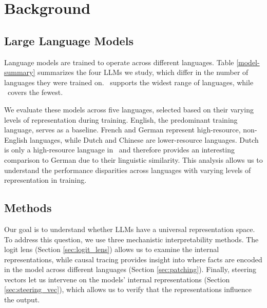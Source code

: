 \section{Background} \label{sec:background}

\subsection{Large Language Models}

Language models are trained to operate across different languages. 
Table \ref{model-summary} summarizes the four LLMs we study, which differ in the number of languages they were trained on. 
\aya \ supports the widest range of languages, while \gemma \ covers the fewest.

We evaluate these models across five languages, selected based on their varying levels of representation during training. English, the predominant training language, serves as a baseline. French and German represent high-resource, non-English languages, while Dutch and Chinese are lower-resource languages. Dutch is only a high-resource language in \aya \ and therefore provides an interesting comparison to German due to their linguistic similarity.
This analysis allows us to understand the performance disparities across languages with varying levels of representation in training.

\subsection{Methods}

Our goal is to understand whether LLMs have a universal representation space. 
To address this question, we use three mechanistic interpretability methods. 
The logit lens (Section \ref{sec:logit_lens}) allows us to examine the internal representations, while causal tracing provides insight into where facts are encoded in the model across different languages (Section \ref{sec:patching}). 
Finally, steering vectors let us intervene on the models' internal representations (Section \ref{sec:steering_vec}), which allows us to verify that the representations influence the output.


